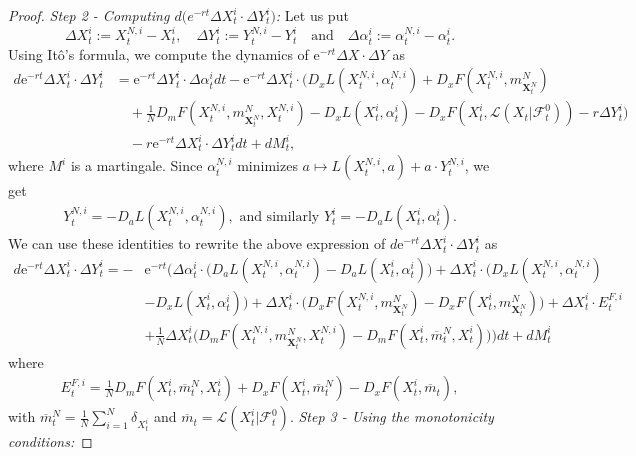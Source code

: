 \documentclass[11pt,reqno]{amsart}
\numberwithin{equation}{section}
\theoremstyle{definition}
\newcommand{\bX}{\mathbf{X}}
\newcommand{\sL}{\mathcal{L}}
\newcommand{\sF}{\mathcal{F}}
\newcommand{\ov}{\overline}
\newcommand\cL{\mathcal L}
\def \e{\mathrm{e}}
\begin{document}
\begin{proof}
 \textit{Step 2 - Computing $d \big( e^{-rt} \Delta X_t^i \cdot \Delta Y_t^i \big)$:}
  Let us put 
  $$\Delta X^i_t:= X^{N,i}_t - X^i_t,\quad \Delta Y^i_t:=Y^{N,i}_t - Y^i_t\quad \mathrm{and} \quad \Delta \alpha^{i}_t:= \alpha^{N,i}_t - \alpha^i_t.
  $$
  Using It\^o's formula, we compute the dynamics of $\e^{-rt}\Delta X\cdot\Delta Y$ as
\begin{align*}  
  d \e^{-rt}\Delta X_t^i \cdot \Delta Y_t^i &= \e^{-rt}\Delta Y_t^i \cdot \Delta \alpha_t^i dt - \e^{-rt}\Delta X_t^i \cdot \bigg(D_x L(X_t^{N,i}, \alpha_t^{N,i}) + D_x F(X_t^{N,i}, m_{\bX_t^N}^N) \nonumber \\
  &\quad + \frac{1}{N} D_m F(X_t^{N,i}, m_{\bX_t^N}^N, X_t^{N,i}) - D_x L(X_t^i, \alpha_t^i) - D_x F(X_t^i, \cL(X_{t}|\sF^0_t)) - r\Delta Y^i_t \bigg)\\ 
  &\quad - r\e^{-rt}\Delta X^i_t\cdot\Delta Y^i_t dt + dM_t^i, 
\end{align*}
where $M^i$ is a martingale. 
Since $\alpha_t^{N,i}$ minimizes $a \mapsto  L(X_t^{N,i}, a) + a \cdot Y_t^{N,i}$, we get 
\begin{align*}
Y_t^{N,i} = - D_a L(X_t^{N,i}, \alpha_t^{N,i}), \text{ and similarly }
{Y}_t^i = - D_a L({X}_t^{i}, {\alpha}_t^{i}).  
\end{align*}
We can use these identities to rewrite the above expression of $ d \e^{-rt}\Delta X_t^i \cdot \Delta Y_t^i$ as
\begin{align*} 
  d \e^{-rt}\Delta X_t^i \cdot \Delta Y_t^i = - &\e^{-rt}\bigg(\Delta \alpha^i_t \cdot  \big(D_a L(X_t^{N,i}, \alpha_t^{N,i}) - D_a L(X_t^i, \alpha_t^i) \big) + \Delta X_t^i \cdot \big(D_x L(X_t^{N,i}, \alpha_t^{N,i})\\
   &- D_x L(X_t^i, \alpha_t^i) \big) 
  + \Delta X_t^i \cdot \big(D_x F(X_t^{N,i}, m_{\bX_t^N}^N) - D_x F(X_t^i, m_{\bX_t^N}^N)\big) + \Delta X_t^i \cdot E_t^{F,i}  \\
  & + \frac{1}{N} \Delta X_t^i  \big( D_m F(X_t^{N,i}, m_{\bX_t^N}^N, X_t^{N,i}) - D_m F(X_t^{i}, \ov{m}_t^N, X_t^i)\big) \bigg) dt + dM_t^i
\end{align*}
where 
\begin{align*}
  E_t^{F,i} = \frac{1}{N} D_m F(X_t^{i}, \ov{m}_t^N, X_t^{i}) + D_x F(X_t^i, \ov{m}_t^N) -  D_x F(X_t^i, \ov{m}_t), 
\end{align*}
with $\ov{m}_t^N = \frac{1}{N} \sum_{i = 1}^N \delta_{X^i_t}$ and $\ov{m}_t = \sL(X_t^i | \sF_t^0)$. 
\newline \newline 
\textit{Step 3 - Using the monotonicity conditions: }

\end{proof}
\end{document}
